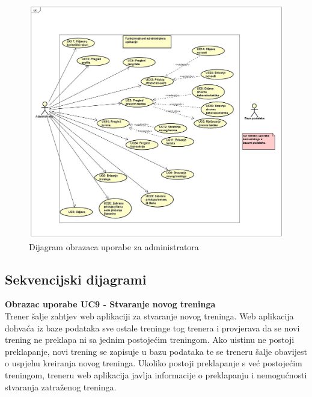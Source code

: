 		
		\begin{figure}[H]
			\centerfloat
			\includegraphics[scale=0.35]{dijagrami/UseCaseAdministrator.jpg} %
			\caption{Dijagram obrazaca uporabe za administratora}
			\label{fig:DOU_A}
		\end{figure}
		
		\eject
				
			\subsection{Sekvencijski dijagrami}
			
			
				\textbf{Obrazac uporabe UC9 - Stvaranje novog treninga}\\
				Trener šalje zahtjev web aplikaciji za stvaranje novog treninga. Web aplikacija dohvaća iz baze podataka sve ostale treninge tog trenera i provjerava da se novi trening ne preklapa ni sa jednim postojećim treningom. Ako uistinu ne postoji preklapanje, novi trening se zapisuje u bazu podataka te se treneru šalje obavijest o uspjehu kreiranja novog treninga. Ukoliko postoji preklapanje s već postojećim treningom, treneru web aplikacija javlja informacije o preklapanju i nemogućnosti stvaranja zatraženog treninga.
				\eject
				
				\makeatletter
                                                                        \newcommand*{\centerfloat}{%
                                                                          \parindent \z@
                                                                          \leftskip \z@ \@plus 1fil \@minus \textwidth
                                                                          \rightskip\leftskip
                                                                          \parfillskip \z@skip}
                                                                   \makeatother
				
